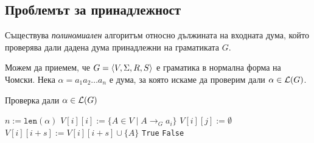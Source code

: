 \subsection{Проблемът за принадлежност}

\begin{thm}
  Съществува {\em полиномиален} алгоритъм относно дължината на входната дума, който проверява дали дадена дума принадлежни на граматиката $G$.
\end{thm}
Можем да приемем, че $G = \langle{V,\Sigma,R,S}\rangle$ е граматика в нормална форма на Чомски.
Нека $\alpha = a_1a_2\dots a_n$ е дума, за която искаме да проверим дали $\alpha \in \mathcal{L}(G)$.
\begin{algorithm}[H]
  \caption{Проверка дали $\alpha \in \mathcal{L}(G)$}
  \label{alg:belongs-to-grammar}
  \begin{algorithmic}[1]
    \State $n := \texttt{len}(\alpha)$ 
    \State $V[i][i] := \{A \in V \mid A\to_G a_i\}$
    \EndFor
    \State $V[i][j] := \emptyset$
    \EndFor      
    \ForAll{$s \in [1, n)$} 
    \ForAll{$k \in [i, i + s)$}
    \State $V[i][i+s] := V[i][i+s] \cup \{A\}$
    \EndIf
    \EndFor
    \EndFor
    \EndFor
    \State \Return \texttt{True}
    \Else
    \State \Return \texttt{False}
    \EndIf
  \end{algorithmic}
\end{algorithm}

